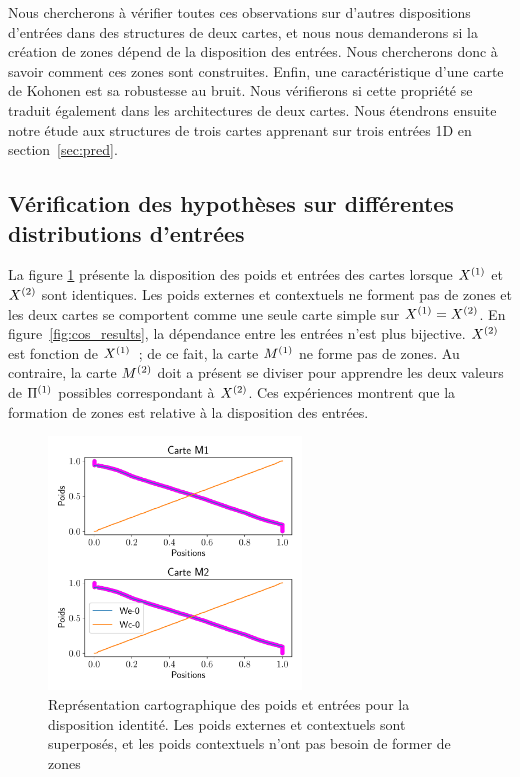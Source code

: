\documentclass[../main]{subfiles}
\begin{document}
Nous chercherons à vérifier toutes ces observations sur d'autres dispositions d'entrées dans des structures de deux cartes, et nous nous demanderons si la création de zones dépend de la disposition des entrées. Nous chercherons donc à savoir comment ces zones sont construites. Enfin, une caractéristique d'une carte de Kohonen est sa robustesse au bruit. Nous vérifierons si cette propriété se traduit également dans les architectures de deux cartes.
Nous étendrons ensuite notre étude aux structures de trois cartes apprenant sur trois entrées 1D en section~\ref{sec:pred}.





\subsection{Vérification des hypothèses sur différentes distributions d'entrées}

La figure \ref{fig:id_results} présente la disposition des poids et entrées des cartes lorsque $X^{({1})}$ et $X^{({2})}$ sont identiques. Les poids externes et contextuels ne forment pas de zones et les deux cartes se comportent comme une seule carte simple sur $X^{({1})} = X^{({2})}$.
En figure~\ref{fig:cos_results}, la dépendance entre les entrées n'est plus bijective. $X^{({2})}$ est fonction de $X^{({1})}$~; de ce fait, la carte $M^{({1})}$ ne forme pas de zones. Au contraire, la carte $M^{({2})}$ doit a présent se diviser pour apprendre les deux valeurs de $\Pi^{({1})}$ possibles correspondant à $X^{({2})}$. Ces expériences montrent que la formation de zones est relative à la disposition des entrées.

\begin{figure}
	\centering\includegraphics[width=0.6\textwidth]{2som_id_w.pdf}
	\caption{Représentation cartographique des poids et entrées pour la disposition identité. Les poids externes et contextuels sont superposés, et les poids contextuels n'ont pas besoin de former de zones \label{fig:id_results}}
	\end{figure}
	
\end{document}
